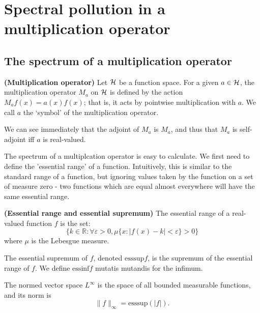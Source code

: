 \documentclass[../main.tex]{subfiles}
\begin{document}
\section{Spectral pollution in a multiplication operator}
\subsection{The spectrum of a multiplication operator}
\begin{definition}{\textbf{(Multiplication operator)}}
Let $\mathcal{H}$ be a function space. For a given $a \in \mathcal{H}$, the multiplication operator $M_a$ on $\mathcal{H}$ is defined by
the action $M_af(x) = a(x)f(x)$; that is, it acts by pointwise multiplication with $a$. We call $a$ the `symbol' of
the multiplication operator.
\end{definition}

We can see immediately that the adjoint of $M_a$ is $M_{\overline{a}}$, and thus that $M_a$ is self-adjoint iff $a$ is real-valued.

The spectrum of a multiplcation operator is easy to calculate. We first
need to define the 'essential range' of a function. Intuitively, this is
similar to the standard range of a function, but ignoring values taken by
the function on a set of measure zero - two functions which are equal
almost everywhere will have the same essential range.

\begin{definition}{\textbf{(Essential range and essential supremum)}}\label{defn:essential-range}
  The essential range of a real-valued function $f$ is the set:
  $$\{k \in \mathbb{R} : \forall \varepsilon > 0, \mu\{x : |f(x) - k| < \varepsilon\} > 0\}$$
  where $\mu$ is the Lebesgue measure.
  
  The essential supremum of $f$, denoted $\mathrm{esssup}f$, is the supremum of the essential range of $f$. 
  We define $\mathrm{essinf}f$ mutatis mutandis for the infimum.
\end{definition}

The normed vector space $L^\infty$ is the space of all bounded measurable functions, and its norm is $$\|f\|_\infty = \text{esssup}(|f|).$$
\end{document}

